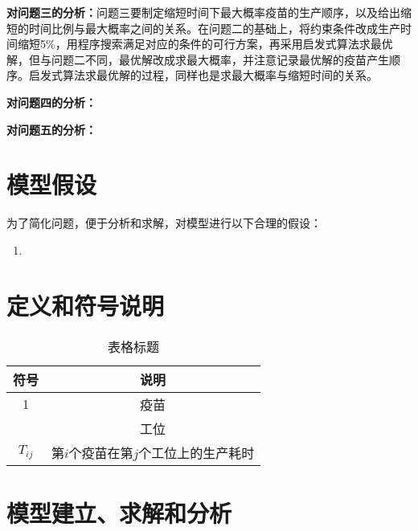 \documentclass[UTF8]{ctexart}
\begin{document}
	\textbf{对问题三的分析：}问题三要制定缩短时间下最大概率疫苗的生产顺序，以及给出缩短的时间比例与最大概率之间的关系。在问题二的基础上，将约束条件改成生产时间缩短5\%，用程序搜索满足对应的条件的可行方案，再采用启发式算法求最优解，但与问题二不同，最优解改成求最大概率，并注意记录最优解的疫苗产生顺序。启发式算法求最优解的过程，同样也是求最大概率与缩短时间的关系。
	
	\textbf{对问题四的分析：}
	
	
	\textbf{对问题五的分析：}
	
	
	\section{模型假设}
	为了简化问题，便于分析和求解，对模型进行以下合理的假设：
	\begin{enumerate}
		\item
	\end{enumerate}
	
	\section{定义和符号说明}
	\begin{table}[htbp]
		\centering
		\begin{tabular}{ c c }
			\toprule[2pt]
			符号 & 说明   \\
			\hline
			1 & 疫苗  \\
			  &  工位 \\
			 $T_{ij}$&  第$i$个疫苗在第$j$个工位上的生产耗时 \\
			  
			\bottomrule[2pt]
		\end{tabular}\caption{表格标题}\label{p1}
	\end{table}
	
	
	
	\section{模型建立、求解和分析}
\end{document}
